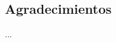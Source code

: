 \vspace*{15em}

\begin{center}
    \section*{Agradecimientos}
    
        ...

\end{center}

{}

\newpage